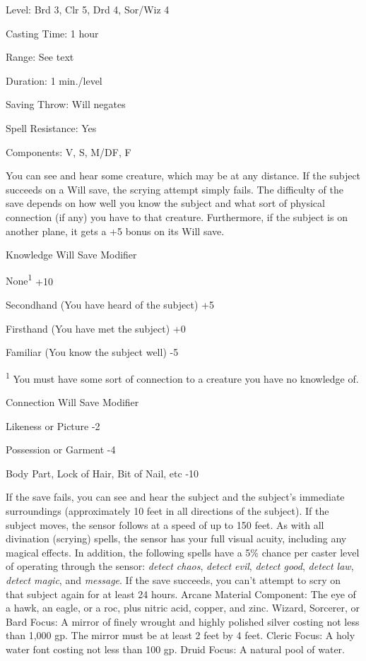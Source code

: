 
\begin{description*}
\item[Level:] Brd 3, Clr 5, Drd 4, Sor/Wiz 4
\item[Casting Time:] 1 hour
\item[Range:] See text
\item[Duration:] 1 min./level
\item[Saving Throw:] Will negates
\item[Spell Resistance:] Yes
\item[Components:] V, S, M/DF, F
\end{description*}

You can see and hear some creature, which may be at any distance. If the subject
succeeds on a Will save, the scrying attempt simply fails. The difficulty of the
save depends on how well you know the subject and what sort of physical connection
(if any) you have to that creature. Furthermore, if the subject is on another plane,
it gets a +5 bonus on its Will save.
\begin{description*}
\item[Knowledge] Will Save Modifier
\item[None\textsuperscript{1}] +10
\item[Secondhand (You have heard of the subject)] +5
\item[Firsthand (You have met the subject)] +0
\item[Familiar (You know the subject well)] -5
\end{description*}
\textsuperscript{1} You must have some sort of connection to a creature you have no knowledge of.
\begin{description*}
\item[Connection] Will Save Modifier
\item[Likeness or Picture] -2
\item[Possession or Garment] -4
\item[Body Part, Lock of Hair, Bit of Nail, etc] -10
\end{description*}
If the save fails, you can see and hear the subject and the subject's immediate
surroundings (approximately 10 feet in all directions of the subject). If the subject
moves, the sensor follows at a speed of up to 150 feet.
As with all divination (scrying) spells, the sensor has your full visual acuity,
including any magical effects. In addition, the following spells have a 5\% chance
per caster level of operating through the sensor: \textit{detect chaos}, \textit{detect
evil}, \textit{detect good}, \textit{detect law}, \textit{detect magic}, and \textit{message}.
If the save succeeds, you can't attempt to scry on that subject again for at least
24 hours.
Arcane Material Component: The eye of a hawk, an eagle, or a roc, plus
nitric acid, copper, and zinc.
Wizard, Sorcerer, or Bard Focus: A mirror of finely wrought and highly
polished silver costing not less than 1,000 gp. The mirror must be at least 2 feet
by 4 feet.
Cleric Focus: A holy water font costing not less than 100 gp.
Druid Focus: A natural pool of water.